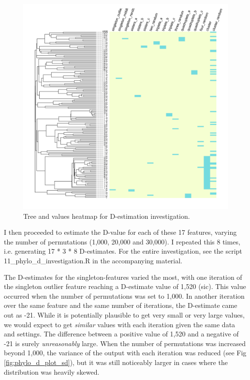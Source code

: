 \documentclass[12pt,letterpaper]{article}
\begin{document}
\begin{figure}[!ht]
\centering
\includegraphics[width=14cm]{illustrations/plots_from_R/phylo_d_heatmap_tree.png}
\caption{Tree and values heatmap for D-estimation investigation.}
\label{fig:phylo_d_heatmap}
\end{figure}

I then proceeded to estimate the D-value for each of these 17 features, varying the number of permutations (1,000, 20,000 and 30,000). I repeated this 8 times, i.e. generating 17 * 3 * 8 D-estimates. For the entire investigation, see the script 11\_phylo\_d\_investigation.R in the accompanying material.

The D-estimates for the singleton-features varied the most, with one iteration of the singleton outlier feature reaching a D-estimate value of 1,520 (sic). This value occurred when the number of permutations was set to 1,000. In another iteration over the same feature and the same number of iterations, the D-estimate came out as -21. While it is potentially plausible to get very small or very large values, we would expect to get \emph{similar} values with each iteration given the same data and settings. The difference between a positive value of 1,520 and a negative of -21 is surely \emph{unreasonably} large. When the number of permutations was increased beyond 1,000, the variance of the output with each iteration was reduced (see Fig \ref{fig:phylo_d_plot_sd}), but it was still noticeably larger in cases where the distribution was heavily skewed.
\end{document}

